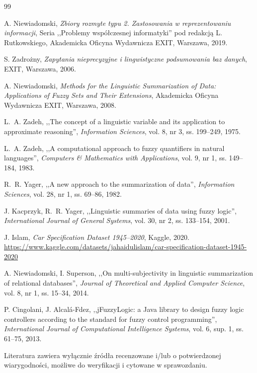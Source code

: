 \documentclass{article}
\begin{document}
\begin{thebibliography}{99}
\small
\setlength{\itemsep}{0pt}
\setlength{\parsep}{0pt}

 A. Niewiadomski,
\textit{Zbiory rozmyte typu 2. Zastosowania w reprezentowaniu informacji},
Seria ,,Problemy współczesnej informatyki'' pod redakcją L. Rutkowskiego,
Akademicka Oficyna Wydawnicza EXIT, Warszawa, 2019.

 S. Zadrożny,
\textit{Zapytania nieprecyzyjne i lingwistyczne podsumowania baz danych},
EXIT, Warszawa, 2006.

 A. Niewiadomski,
\textit{Methods for the Linguistic Summarization of Data: Applications of
Fuzzy Sets and Their Extensions}, Akademicka Oficyna Wydawnicza EXIT,
Warszawa, 2008.

 L.~A. Zadeh,
,,The concept of a linguistic variable and its application to approximate
reasoning'', \textit{Information Sciences}, vol. 8, nr 3, ss. 199--249, 1975.

 L.~A. Zadeh,
,,A computational approach to fuzzy quantifiers in natural languages'',
\textit{Computers \& Mathematics with Applications}, vol. 9, nr 1,
ss. 149--184, 1983.

 R.~R. Yager,
,,A new approach to the summarization of data'',
\textit{Information Sciences}, vol. 28, nr 1, ss. 69--86, 1982.

 J. Kacprzyk, R.~R. Yager,
,,Linguistic summaries of data using fuzzy logic'',
\textit{International Journal of General Systems}, vol. 30, nr 2,
ss. 133--154, 2001.

 J. Islam,
\textit{Car Specification Dataset 1945--2020}, Kaggle, 2020.\\
\url{https://www.kaggle.com/datasets/jahaidulislam/car-specification-dataset-1945-2020}

 A. Niewiadomski, I. Superson,
,,On multi-subjectivity in linguistic summarization of relational databases'',
\textit{Journal of Theoretical and Applied Computer Science}, vol. 8, nr 1,
ss. 15--34, 2014.

 P. Cingolani, J. Alcalá-Fdez,
,,jFuzzyLogic: a Java library to design fuzzy logic controllers according to
the standard for fuzzy control programming'', \textit{International Journal of
Computational Intelligence Systems}, vol. 6, sup. 1, ss. 61--75, 2013.

\end{thebibliography}

Literatura zawiera wyłącznie źródła recenzowane i/lub o potwierdzonej wiarygodności,
możliwe do weryfikacji i cytowane w sprawozdaniu.

\end{document}

